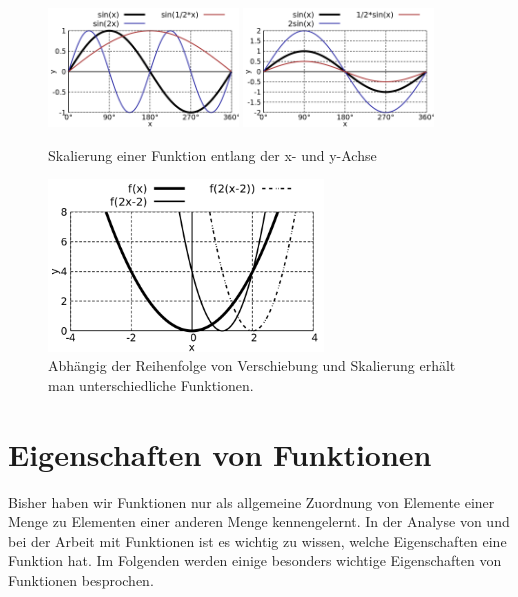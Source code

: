 \begin{figure}
    \centering
    \includegraphics[width=0.45\textwidth]{./gnuplot/transform-fun-scale-x}
    \includegraphics[width=0.45\textwidth]{./gnuplot/transform-fun-scale-y}
    \caption{Skalierung einer Funktion entlang der x- und y-Achse}
    \label{fig:TransformFunScale}
\end{figure}

\begin{figure}
    \centering
    \includegraphics[width=0.65\textwidth]{./gnuplot/transform-translate-scale-order}
    \caption{Abhängig der Reihenfolge von Verschiebung und Skalierung erhält man unterschiedliche Funktionen.}
    \label{fig:TransformOrder}
\end{figure}



\section{Eigenschaften von Funktionen}

Bisher haben wir Funktionen nur als allgemeine Zuordnung von Elemente einer Menge zu Elementen einer anderen Menge kennengelernt. In der Analyse von und bei der Arbeit mit Funktionen ist es wichtig zu wissen, welche Eigenschaften eine Funktion hat. Im Folgenden werden einige besonders wichtige Eigenschaften von Funktionen besprochen.

